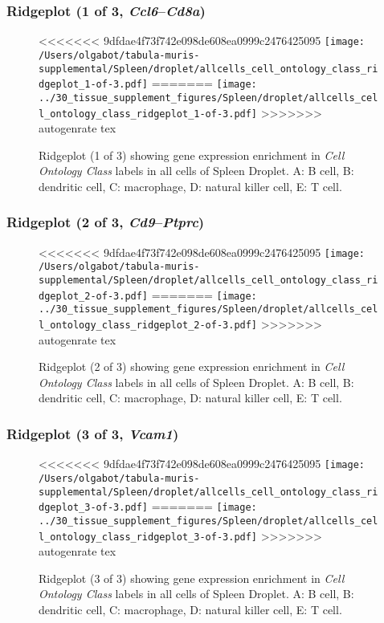 \subsubsection{Ridgeplot (1 of 3, \emph{Ccl6}--\emph{Cd8a})}
\begin{figure}[h]
\centering
<<<<<<< 9dfdae4f73f742e098de608ea0999c2476425095
\texttt{[image: /Users/olgabot/tabula-muris-supplemental/Spleen/droplet/allcells\_cell\_ontology\_class\_ridgeplot\_1-of-3.pdf]}
=======
\texttt{[image: ../30\_tissue\_supplement\_figures/Spleen/droplet/allcells\_cell\_ontology\_class\_ridgeplot\_1-of-3.pdf]}
>>>>>>> autogenrate tex

\caption{ Ridgeplot (1 of 3)  showing gene expression enrichment in \emph{Cell Ontology Class} labels in all cells of Spleen Droplet. A: B cell, B: dendritic cell, C: macrophage, D: natural killer cell, E: T cell.}
\end{figure}


\clearpage

\subsubsection{Ridgeplot (2 of 3, \emph{Cd9}--\emph{Ptprc})}
\begin{figure}[h]
\centering
<<<<<<< 9dfdae4f73f742e098de608ea0999c2476425095
\texttt{[image: /Users/olgabot/tabula-muris-supplemental/Spleen/droplet/allcells\_cell\_ontology\_class\_ridgeplot\_2-of-3.pdf]}
=======
\texttt{[image: ../30\_tissue\_supplement\_figures/Spleen/droplet/allcells\_cell\_ontology\_class\_ridgeplot\_2-of-3.pdf]}
>>>>>>> autogenrate tex

\caption{ Ridgeplot (2 of 3)  showing gene expression enrichment in \emph{Cell Ontology Class} labels in all cells of Spleen Droplet. A: B cell, B: dendritic cell, C: macrophage, D: natural killer cell, E: T cell.}
\end{figure}


\clearpage

\subsubsection{Ridgeplot (3 of 3, \emph{Vcam1})}
\begin{figure}[h]
\centering
<<<<<<< 9dfdae4f73f742e098de608ea0999c2476425095
\texttt{[image: /Users/olgabot/tabula-muris-supplemental/Spleen/droplet/allcells\_cell\_ontology\_class\_ridgeplot\_3-of-3.pdf]}
=======
\texttt{[image: ../30\_tissue\_supplement\_figures/Spleen/droplet/allcells\_cell\_ontology\_class\_ridgeplot\_3-of-3.pdf]}
>>>>>>> autogenrate tex

\caption{ Ridgeplot (3 of 3)  showing gene expression enrichment in \emph{Cell Ontology Class} labels in all cells of Spleen Droplet. A: B cell, B: dendritic cell, C: macrophage, D: natural killer cell, E: T cell.}
\end{figure}


